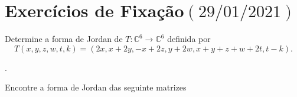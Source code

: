 \chapter{Exercícios de Fixação\quad$\left(29/01/2021\right)$}

\begin{questions}
	\question\label{exercício:4.1}

	Determine a forma de Jordan de
	$T\colon\mathbb{C}^{6}\to\mathbb{C}^{6}$ definida por
	\[
		T\left(x,y,z,w,t,k\right)=
		\left(2x,x+2y,-x+2z,y+2w,x+y+z+w+2t,t-k\right).
	\]

	\begin{solutionordottedlines}
		.
	\end{solutionordottedlines}

	\question\label{exercício:4.2}

	Encontre a forma de Jordan das seguinte matrizes

	\begin{parts}
\end{parts}
\end{questions}
